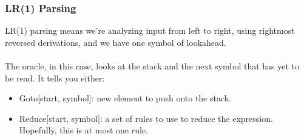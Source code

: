 \documentclass[]{article}
\theoremstyle{definition}
\begin{document}
			\subsubsection{LR(1) Parsing}
				LR(1) parsing means we're analyzing input from left to right, using rightmost reversed derivations, and we have one symbol of lookahead. 
				\\ \\
				The oracle, in this case, looks at the stack and the next symbol that has yet to be read. It tells you either:
				\begin{itemize}
					\item Goto[start, symbol]: new element to push onto the stack.
					\item Reduce[start, symbol]: a set of rules to use to reduce the expression. Hopefully, this is at most one rule.
				\end{itemize}
\end{document}

